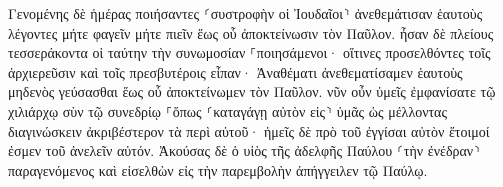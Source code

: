 \documentclass{openreader}
\begin{document}
Γενομένης δὲ ἡμέρας ποιήσαντες ⸂συστροφὴν οἱ Ἰουδαῖοι⸃ ἀνεθεμάτισαν ἑαυτοὺς λέγοντες μήτε φαγεῖν μήτε πιεῖν ἕως οὗ ἀποκτείνωσιν τὸν Παῦλον. 
ἦσαν δὲ πλείους τεσσεράκοντα οἱ ταύτην τὴν συνωμοσίαν ⸀ποιησάμενοι· 
οἵτινες προσελθόντες τοῖς ἀρχιερεῦσιν καὶ τοῖς πρεσβυτέροις εἶπαν· Ἀναθέματι ἀνεθεματίσαμεν ἑαυτοὺς μηδενὸς γεύσασθαι ἕως οὗ ἀποκτείνωμεν τὸν Παῦλον. 
νῦν οὖν ὑμεῖς ἐμφανίσατε τῷ χιλιάρχῳ σὺν τῷ συνεδρίῳ ⸀ὅπως ⸂καταγάγῃ αὐτὸν εἰς⸃ ὑμᾶς ὡς μέλλοντας διαγινώσκειν ἀκριβέστερον τὰ περὶ αὐτοῦ· ἡμεῖς δὲ πρὸ τοῦ ἐγγίσαι αὐτὸν ἕτοιμοί ἐσμεν τοῦ ἀνελεῖν αὐτόν. 
Ἀκούσας δὲ ὁ υἱὸς τῆς ἀδελφῆς Παύλου ⸂τὴν ἐνέδραν⸃ παραγενόμενος καὶ εἰσελθὼν εἰς τὴν παρεμβολὴν ἀπήγγειλεν τῷ Παύλῳ. 
\end{document}
